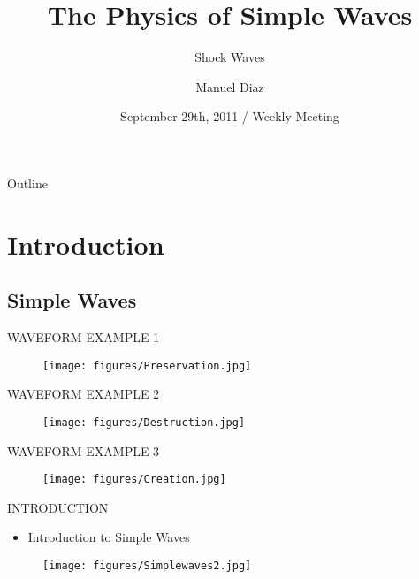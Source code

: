 \documentclass{beamer}
\title[Governing Equations] %
{The Physics of Simple Waves}
\subtitle
{Shock Waves} %
\author[Manuel Diaz] %
{Manuel Diaz\inst{1} }
\institute[National Taiwan University] %
{
  \inst{1}%
  National Taiwan University\\
  Institute of Applied Mechanics}
\date[September 29th, 2011] %
{September 29th, 2011 / Weekly Meeting}
\begin{document}
\begin{frame}
  \titlepage
\end{frame}

\begin{frame}{Outline}
  \tableofcontents
\end{frame}




\section{Introduction}

\subsection{Simple Waves}

\begin{frame}{WAVEFORM EXAMPLE 1}
  \begin{figure}
   \texttt{[image: figures/Preservation.jpg]}
  \end{figure}
\end{frame}

\begin{frame}{WAVEFORM EXAMPLE 2}
  \begin{figure}
   \texttt{[image: figures/Destruction.jpg]}
  \end{figure}
\end{frame}

\begin{frame}{WAVEFORM EXAMPLE 3}
  \begin{figure}
   \texttt{[image: figures/Creation.jpg]}
  \end{figure}
\end{frame}

\begin{frame}{INTRODUCTION}
  \begin{itemize}
   \item Introduction to Simple Waves
  \end{itemize}
  \begin{figure}
   \texttt{[image: figures/Simplewaves2.jpg]}
  \end{figure}
\end{frame}
\end{document}
